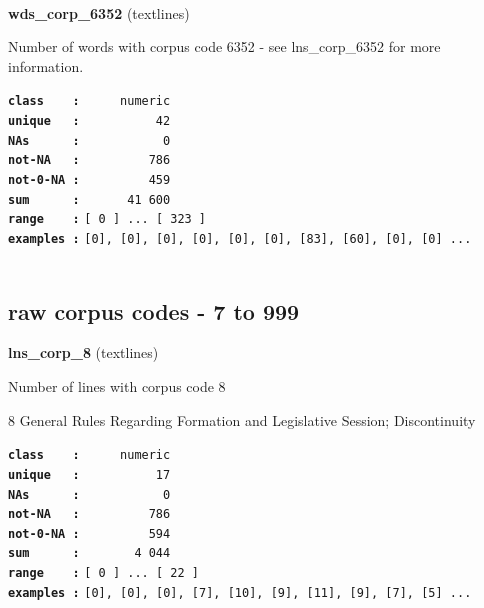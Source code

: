 \documentclass[]{article}
\begin{document}
~

\textbf{wds\_corp\_6352} (textlines)

Number of words with corpus code 6352 - see lns\_corp\_6352 for more
information.

\textbf{\texttt{class\ \ \ \ :}} \texttt{~~~~~numeric}\\
\textbf{\texttt{unique\ \ \ :}} \texttt{~~~~~~~~~~42}\\
\textbf{\texttt{NAs\ \ \ \ \ \ :}} \texttt{~~~~~~~~~~~0}\\
\textbf{\texttt{not-NA\ \ \ :}} \texttt{~~~~~~~~~786}\\
\textbf{\texttt{not-0-NA\ :}} \texttt{~~~~~~~~~459}\\
\textbf{\texttt{sum\ \ \ \ \ \ :}} \texttt{~~~~~~41~600}\\
\textbf{\texttt{range\ \ \ \ :}}
\texttt{{[}\ 0\ {]}\ ...\ {[}\ 323\ {]}}\\
\textbf{\texttt{examples\ :}}
\texttt{{[}0{]},\ {[}0{]},\ {[}0{]},\ {[}0{]},\ {[}0{]},\ {[}0{]},\ {[}83{]},\ {[}60{]},\ {[}0{]},\ {[}0{]}\ ...}\\

~

\subsection{raw corpus codes - 7 to
999}\label{raw-corpus-codes---7-to-999}

\textbf{lns\_corp\_8} (textlines)

Number of lines with corpus code 8

8 General Rules Regarding Formation and Legislative Session;
Discontinuity

\textbf{\texttt{class\ \ \ \ :}} \texttt{~~~~~numeric}\\
\textbf{\texttt{unique\ \ \ :}} \texttt{~~~~~~~~~~17}\\
\textbf{\texttt{NAs\ \ \ \ \ \ :}} \texttt{~~~~~~~~~~~0}\\
\textbf{\texttt{not-NA\ \ \ :}} \texttt{~~~~~~~~~786}\\
\textbf{\texttt{not-0-NA\ :}} \texttt{~~~~~~~~~594}\\
\textbf{\texttt{sum\ \ \ \ \ \ :}} \texttt{~~~~~~~4~044}\\
\textbf{\texttt{range\ \ \ \ :}}
\texttt{{[}\ 0\ {]}\ ...\ {[}\ 22\ {]}}\\
\textbf{\texttt{examples\ :}}
\texttt{{[}0{]},\ {[}0{]},\ {[}0{]},\ {[}7{]},\ {[}10{]},\ {[}9{]},\ {[}11{]},\ {[}9{]},\ {[}7{]},\ {[}5{]}\ ...}\\
\end{document}
